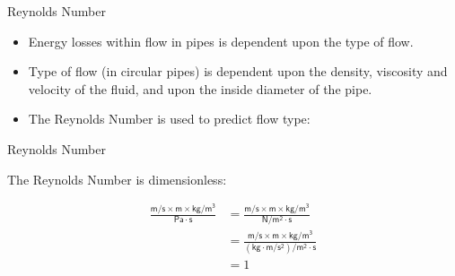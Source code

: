 \documentclass[9pt,xcolor={svgnames, x11names},professionalfonts, mathserif]{beamer}
\begin{document}
\begin{frame}{Reynolds Number}
	\begin{itemize}
		\item Energy losses within flow in pipes is dependent upon the type of flow.
		\item Type of flow (in circular pipes) is dependent upon the density, viscosity and velocity of the fluid, and upon
		      the inside diameter of the pipe.
		\item The Reynolds Number is used to predict flow type:
	\end{itemize}
	
	
\end{frame}

\begin{frame}{Reynolds Number}
	\begin{center}
		The Reynolds Number is dimensionless:\parb
		
		\begin{mybox}[width=9cm, title=Reynolds Number Units]
			\begin{align*}
				\mathsf{\frac{m/s \times m \times kg/m^3}{Pa\cdot s}} & = \mathsf{\frac{m/s \times m \times kg/m^3}{N/m^2\cdot s}}                             \\
				                                                      & = \mathsf{\frac{m/s \times m \times kg/m^3}{\left(kg\cdot m/s^2\right)  / m^2\cdot s}} \\
				                                                      & = 1                                                                                    
			\end{align*}
		\end{mybox}
	\end{center}
	
\end{frame}
\end{document}

